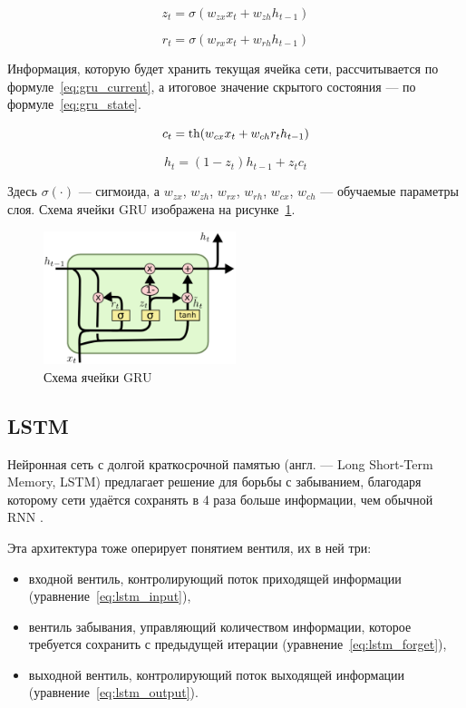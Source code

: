 \begin{equation}
    \label{eq:gru_update}
    z_t = \sigma(w_{zx}x_t+w_{zh}h_{t-1})
\end{equation}

\begin{equation}
    \label{eq:gru_reset}
    r_t = \sigma(w_{rx}x_t+w_{rh}h_{t-1})
\end{equation}

Информация, которую будет хранить текущая ячейка сети, рассчитывается по формуле \ref*{eq:gru_current}, а итоговое значение скрытого состояния --- по формуле \ref*{eq:gru_state}.

\begin{equation}
    \label{eq:gru_current}
    c_t = \operatorname{th}(w_{cx}x_t+w_{ch}r_th_{t-1})
\end{equation}

\begin{equation}
    \label{eq:gru_state}
    h_t = (1-z_t)h_{t-1}+z_tc_t
\end{equation}

Здесь $\sigma(\cdot)$ --- сигмоида, а $w_{zx}$, $w_{zh}$, $w_{rx}$, $w_{rh}$, $w_{cx}$, $w_{ch}$ --- обучаемые параметры слоя.
Схема ячейки GRU изображена на рисунке \ref*{fig:gru}.

\begin{figure}[h]
    \centering
    \includegraphics[width=0.5\textwidth]{../inc/images/gru.png}
    \caption{Схема ячейки GRU}
    \label{fig:gru}
\end{figure}

\subsection{LSTM}

Нейронная сеть с долгой краткосрочной памятью (англ. --- Long Short-Term Memory, LSTM) предлагает решение для борьбы с забыванием, благодаря которому сети удаётся сохранять в 4 раза больше информации, чем обычной RNN \cite{art:rnn}.

Эта архитектура тоже оперирует понятием вентиля, их в ней три:
\begin{itemize}
    \item входной вентиль, контролирующий поток приходящей информации (уравнение \ref*{eq:lstm_input}),
    \item вентиль забывания, управляющий количеством информации, которое требуется сохранить с предыдущей итерации (уравнение \ref*{eq:lstm_forget}),
    \item выходной вентиль, контролирующий поток выходящей информации (уравнение \ref*{eq:lstm_output}).
\end{itemize}


